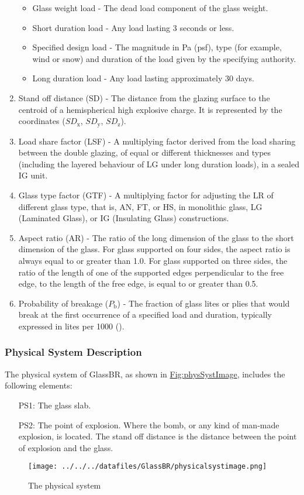 \documentclass[12pt]{article}
\begin{document}
\begin{enumerate}
\begin{itemize}
\item{Glass weight load - The dead load component of the glass weight.}
\item{Short duration load - Any load lasting 3 seconds or less.}
\item{Specified design load - The magnitude in Pa (psf), type (for example, wind or snow) and duration of the load given by the specifying authority.}
\item{Long duration load - Any load lasting approximately 30 days.}
\end{itemize}
\item{Stand off distance (SD) - The distance from the glazing surface to the centroid of a hemispherical high explosive charge. It is represented by the coordinates (${SD_{\text{x}}}$, ${SD_{\text{y}}}$, ${SD_{\text{z}}}$).}
\item{Load share factor (LSF) - A multiplying factor derived from the load sharing between the double glazing, of equal or different thicknesses and types (including the layered behaviour of LG under long duration loads), in a sealed IG unit.}
\item{Glass type factor (GTF) - A multiplying factor for adjusting the LR of different glass type, that is, AN, FT, or HS, in monolithic glass, LG (Laminated Glass), or IG (Insulating Glass) constructions.}
\item{Aspect ratio (AR) - The ratio of the long dimension of the glass to the short dimension of the glass. For glass supported on four sides, the aspect ratio is always equal to or greater than 1.0. For glass supported on three sides, the ratio of the length of one of the supported edges perpendicular to the free edge, to the length of the free edge, is equal to or greater than 0.5.}
\item{Probability of breakage (${P_{\text{b}}}$) - The fraction of glass lites or plies that would break at the first occurrence of a specified load and duration, typically expressed in lites per 1000 (\cite{astm2016}).}
\end{enumerate}
\subsubsection{Physical System Description}
\label{Sec:PhysSyst}
The physical system of GlassBR, as shown in \hyperref[Figure:physSystImage]{Fig:physSystImage}, includes the following elements:

\begin{itemize}
\item[PS1:]{The glass slab.}
\item[PS2:]{The point of explosion. Where the bomb, or any kind of man-made explosion, is located. The stand off distance is the distance between the point of explosion and the glass.}
\end{itemize}
\begin{figure}
\begin{center}
\texttt{[image: ../../../datafiles/GlassBR/physicalsystimage.png]}
\caption{The physical system}
\label{Figure:physSystImage}
\end{center}
\end{figure}
\end{document}
